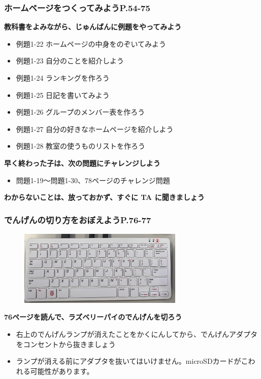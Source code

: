 \documentclass[dvipdfmx]{beamer}
\begin{document}
\begin{frame}[fragile]
	\frametitle{ホームページをつくってみようP.54-75~~~}
      \large\textbf{教科書をよみながら、じゅんばんに例題をやってみよう}
				\begin{itemize}
					\item 例題1-22 ホームページの中身をのぞいてみよう
					\item 例題1-23 自分のことを紹介しよう
					\item 例題1-24 ランキングを作ろう
					\item 例題1-25 日記を書いてみよう
					\item 例題1-26 グループのメンバー表を作ろう
					\item 例題1-27 自分の好きなホームページを紹介しよう
					\item 例題1-28 教室の使うものリストを作ろう
				\end{itemize}
      \vfill
      \large\textbf{早く終わった子は、次の問題にチャレンジしよう}
      \begin{itemize}
        \item 問題1-19～問題1-30、78ページのチャレンジ問題
      \end{itemize}
      \vfill
      \large\textbf{わからないことは、放っておかず、すぐに TA に聞きましょう}
\end{frame}

\begin{frame}[fragile]
	\frametitle{でんげんの切り方をおぼえようP.76-77~~~}
  \begin{figure}
    \centering
    \includegraphics[width=0.7\textwidth]{slide04_010.png}
  \end{figure}
    \vfill
    \large\textbf{76ページを読んで、ラズベリーパイのでんげんを切ろう}
        \begin{itemize}
          \item 右上のでんげんランプが消えたことをかくにんしてから、でんげんアダプタをコンセントから抜きましょう
          \item \textcolor[rgb]{1.0,0.2,0.2}{ランプが消える前にアダプタを抜いてはいけません。microSDカードがこわれる可能性があります。}
        \end{itemize}
\end{frame}
\end{document}
